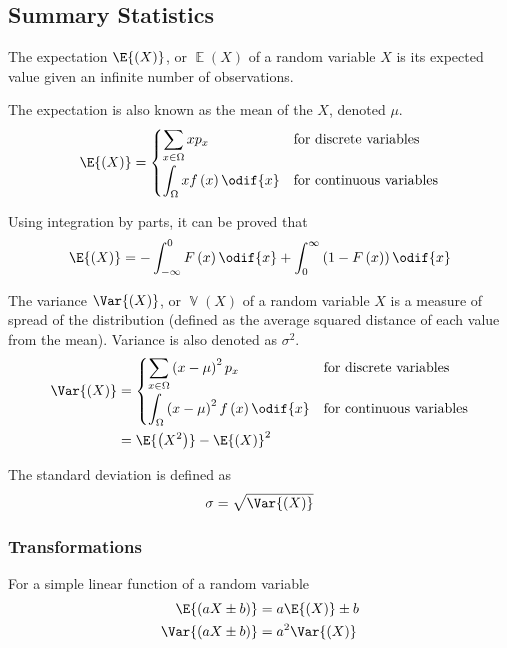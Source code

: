 \documentclass{article}
\begin{document}
\subsection{Summary Statistics}
\begin{definition}[Expectation]
    The expectation \(\E{\left( X \right)}\), or \(\operatorname{\mathbb{E}}{\left( X \right)}\)
    of a random variable \(X\) is its expected value given an
    infinite number of observations.

    The expectation is also known as the mean of the \(X\), denoted \(\mu\).
    \begin{equation*}
        \E{\left( X \right)} =
        \begin{cases}
            \displaystyle \sum_{x \in \Omega} x p_x                & \text{for discrete variables}   \\[0.4cm]
            \displaystyle \int_\Omega x f\left( x \right) \odif{x} & \text{for continuous variables}
        \end{cases}
    \end{equation*}
\end{definition}
\begin{theorem}
    Using integration by parts, it can be proved that
    \begin{equation*}
        \E{\left(X\right)} = -\int_{-\infty}^0 F\left( x \right) \odif{x} + \int_0^\infty \left(1 - F\left( x \right)\right) \odif{x}
    \end{equation*}
\end{theorem}
\begin{definition}[Variance]
    The variance \(\Var{\left( X \right)}\), or \(\operatorname{\mathbb{V}}{\left( X \right)}\) of a random variable \(X\) is a measure of spread
    of the distribution (defined as the average squared distance of each value from the mean).
    Variance is also denoted as \(\sigma^2\).
    \begin{align*}
        \Var{\left( X \right)} & =
        \begin{cases}
            \displaystyle \sum_{x \in \Omega} \left( x - \mu \right)^2 p_x                  & \text{for discrete variables}   \\[0.4cm]
            \displaystyle \int_{\Omega} \left( x - \mu \right)^2 f\left( x \right) \odif{x} & \text{for continuous variables}
        \end{cases} \\
                               & = \E{\left( X^2 \right)} - \E{\left( X \right)}^2
    \end{align*}
\end{definition}
\begin{definition}
    The standard deviation is defined as
    \begin{equation*}
        \sigma = \sqrt{\Var{\left( X \right)}}
    \end{equation*}
\end{definition}
\subsubsection{Transformations}
For a simple linear function of a random variable
\begin{align*}
    \E{\left( aX \pm b \right)}   & = a\E{\left( X \right)} \pm b \\
    \Var{\left( aX \pm b \right)} & = a^2\Var{\left( X \right)}
\end{align*}
\end{document}
